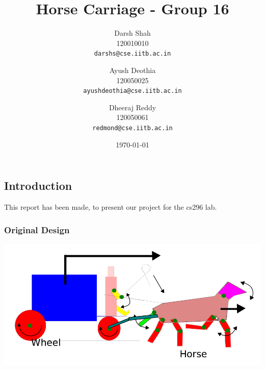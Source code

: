 \documentclass[11pt]{article}
\begin{document}
	\title{Horse Carriage - Group 16}
	\author{
  Darsh Shah\\120010010\\
  \texttt{darshs@cse.iitb.ac.in}
  \and
  Ayush Deothia\\120050025\\
  \texttt{ayushdeothia@cse.iitb.ac.in}
\and
  Dheeraj Reddy\\120050061\\
  \texttt{redmond@cse.iitb.ac.in}
}
		\date{\today}
	\maketitle
	\begin{center}
	\section*{Introduction}
	This report has been made, to present our project for the cs296 lab.
	\\
	\end{center}
	\begin{center}
	\subsubsection*{Original Design}
	\includegraphics[scale=0.35]{./images/original.png}
	\end{center}
\end{document}
